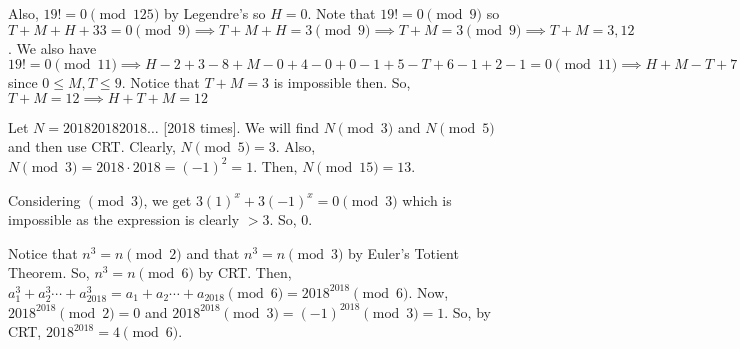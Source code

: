 \documentclass[11pt]{article}
\begin{document}

\begin{sol}
Also, $19!=0\pmod{125}$ by Legendre's so $H=0$. Note that $19!=0\pmod{9}$ so $T+M+H+33=0\pmod{9}\implies T+M+H=3\pmod{9}\implies T+M=3\pmod{9}\implies T+M=3,12$.  We also have $19!=0\pmod{11}\implies H-2+3-8+M-0+4-0+0-1+5-T+6-1+2-1=0\pmod{11}\implies H+M-T+7=0\pmod{11}\implies H+M-T=4\pmod{11}\implies M-T=4\pmod{11}\implies M-T=4$ since $0\leq M,T\leq 9$. Notice that $T+M=3$ is impossible then. So, $T+M=12\implies H+T+M=\boxed{12}$
\end{sol}


\begin{sol}
Let $N=201820182018\ldots$ [2018 times]. We will find $N\pmod{3}$ and $N\pmod{5}$ and then use CRT. Clearly, $N\pmod{5}=3$. Also, $N\pmod{3}=2018\cdot 2018=(-1)^2=1$. Then, $N\pmod{15}=\boxed{13}$.
\end{sol}


\begin{sol}
Considering $\pmod{3}$, we get $3(1)^x+3(-1)^x=0\pmod{3}$ which is impossible as the expression is clearly $>3$. So, $\boxed{0}$.
\end{sol}



\begin{sol}
Notice that $n^3=n\pmod{2}$ and that $n^3=n\pmod{3}$ by Euler's Totient Theorem. So, $n^3=n\pmod{6}$ by CRT. Then, $a_1^3+a_2^3\cdots + a_{2018}^3=a_{1}+a_{2}\cdots +a_{2018}\pmod{6}=2018^{2018}\pmod{6}$. Now, $2018^{2018}\pmod{2}=0$ and $2018^{2018}\pmod{3}=(-1)^{2018}\pmod{3}=1$. So, by CRT, $2018^{2018}=\boxed{4}\pmod{6}$.
\end{sol}
 
\end{document}
